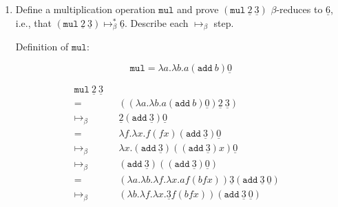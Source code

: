 \documentclass[11pt]{article}
\begin{document}
\begin{enumerate}
\begin{enumerate}
		            \newpage
		      \item Define a multiplication operation $\texttt{mul}$ and prove $(\texttt{mul} \: \underline{2} \: \underline{3})$ $\beta$-reduces to $\underline{6}$, i.e., that $(\texttt{mul} \: \underline{2} \: \underline{3}) \mapsto^*_\beta \underline{6}$. Describe each $\mapsto_\beta$ step.


		            Definition of $ \texttt{mul}$:

		            $$
			            \texttt{mul} = \lambda a. \lambda b. a ( \texttt{add} \: b) \underline{0}
		            $$

		            \begin{align*}
			            \texttt{mul} \: \underline{2} \: \underline{3} &  &                                                                                                                                    \\
			            =                                              &  & (( \lambda a. \lambda b. a ( \texttt{add} \: b) \underline{0} ) \underline{2} \: \underline{3} )                                 & \\
			            \mapsto_\beta                                  &  & \underline{2} ( \texttt{add}  \:\underline{3} ) \underline{0}                                                                    & \\
			            =                                              &  & \lambda f. \lambda x. f( f x)( \texttt{add}  \:\underline{3} ) \underline{0}                                                     & \\
			            \mapsto_\beta                                  &  & \lambda x. ( \texttt{add}  \:\underline{3} )(( \texttt{add}  \:\underline{3} ) x) \underline{0}                                  & \\
			            \mapsto_\beta                                  &  & ( \texttt{add}  \:\underline{3} )(( \texttt{add} \: \underline{3} ) \underline{0} )                                              & \\
			            =                                              &  & ( \lambda a. \lambda b. \lambda f. \lambda x. a f ( b f x)) \underline{3} ( \texttt{add}  \:\underline{3}  \:\underline{0} )     & \\
			            \mapsto_\beta                                  &  & ( \lambda b. \lambda f. \lambda x. \underline{3} f( b f x))( \texttt{add}  \:\underline{3}  \:\underline{0} )                    & \\

\end{align*}
\end{enumerate}
\end{enumerate}
\end{document}
